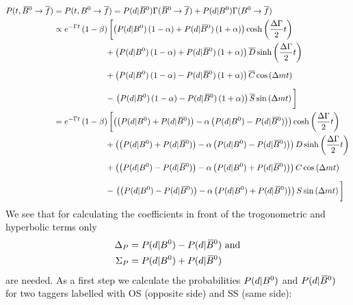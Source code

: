 \begin{align*}
    P(t,\Bzb\to \overline{f})&= P(t,\Bz\to \overline{f}) =P(d|\Bzb)\Gamma(\Bzb\to \overline{f})+P(d|\Bz)\Gamma(\Bz\to \overline{f}) \\
    &\propto e^{-\Gamma t}\left(1-\beta\right)\left[\left(P(d|\Bz)\left(1-\alpha\right)+P(d|\Bzb)\left(1+\alpha\right)\right)
    \cosh\left(\frac{\Delta \Gamma}{2}t\right)\right.\\
    &\hphantom{\propto e^{-\Gamma t}\left(1-\beta\right)}+\left(P(d|\Bz)\left(1-\alpha\right)+P(d|\Bzb)\left(1+\alpha\right)\right)
    \overline{D}\sinh\left(\frac{\Delta \Gamma}{2}t\right)\\
    &\hphantom{\propto e^{-\Gamma t}\left(1-\beta\right)}+\left(P(d|\Bz)\left(1-\alpha\right)-P(d|\Bzb)\left(1+\alpha\right)\right)
    \overline{C}\cos\left(\Delta mt\right)\vphantom{\cosh\left(\frac{\Delta \Gamma}{2}t\right)}\\
    &\hphantom{\propto e^{-\Gamma t}\left(1-\beta\right)}-\left.\left(P(d|\Bz)\left(1-\alpha\right)-P(d|\Bzb)\left(1+\alpha\right)\right)
    \overline{S}\sin\left(\Delta mt\right)\vphantom{\cosh\left(\frac{\Delta \Gamma}{2}t\right)}\right]\\
    &=e^{-\Gamma t}\left(1-\beta\right)\left[\left(\left(P(d|\Bz)+P(d|\Bzb)\right)-\alpha\left(P(d|\Bz)-P(d|\Bzb)\right)\right)
    \cosh\left(\frac{\Delta \Gamma}{2}t\right)\right.\\
    &\hphantom{\propto e^{-\Gamma t}\left(1-\beta\right)}+\left(\left(P(d|\Bz)+P(d|\Bzb)\right)-\alpha\left(P(d|\Bz)-P(d|\Bzb)\right)\right)
    D\sinh\left(\frac{\Delta \Gamma}{2}t\right)\\
    &\hphantom{\propto e^{-\Gamma t}\left(1-\beta\right)}+\left(\left(P(d|\Bz)-P(d|\Bzb)\right)-\alpha\left(P(d|\Bz)+P(d|\Bzb)\right)\right)
    C\cos\left(\Delta mt\right)\vphantom{\cosh\left(\frac{\Delta \Gamma}{2}t\right)}\\
    &\hphantom{\propto e^{-\Gamma t}\left(1-\beta\right)}-\left.\left(\left(P(d|\Bz)-P(d|\Bzb)\right)-\alpha\left(P(d|\Bz)+P(d|\Bzb)\right)\right)
    S\sin\left(\Delta mt\right)\vphantom{\cosh\left(\frac{\Delta \Gamma}{2}t\right)}\right]
\end{align*}
We see that for calculating the coefficients in front of the trogonometric and hyperbolic terms only
\begin{align}
    \Delta_P &= P(d|B^0)-P(d|\kern 0.18em\overline{\kern -0.18em B}{}^0)\text{ and}\\
    \Sigma_P &= P(d|B^0)+P(d|\kern 0.18em\overline{\kern -0.18em B}{}^0)
\end{align}
are needed. As a first step we calculate the probabilities $P(d|B^0)$ and $P(d|\kern 0.18em\overline{\kern -0.18em B}{}^0)$ for two taggers labelled with OS (opposite side) and SS (same side):

